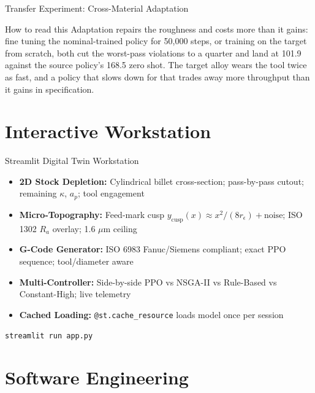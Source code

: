 ﻿\documentclass[11pt,aspectratio=169]{beamer}
\newcommand{\Ra}{R_a}
\begin{document}
\begin{frame}{Transfer Experiment: Cross-Material Adaptation}
\begin{block}{How to read this}
    \alert{Adaptation repairs the roughness and costs more than it gains}: fine tuning the
    nominal-trained policy for 50,000 steps, or training on the target from scratch, both cut the
    worst-pass violations to a quarter and land at 101.9 against the source policy's 168.5 zero shot.
    The target alloy wears the tool twice as fast, and a policy that slows down for that trades away
    more throughput than it gains in specification.
    \end{block}
\end{frame}

\section{Interactive Workstation}

\begin{frame}{Streamlit Digital Twin Workstation}
    \begin{itemize}
        \item \textbf{2D Stock Depletion:} Cylindrical billet cross-section; pass-by-pass cutout; remaining $\kappa$, $a_p$; tool engagement
        \item \textbf{Micro-Topography:} Feed-mark cusp $y_{\text{cusp}}(x) \approx x^2/(8 r_\epsilon) + \text{noise}$; ISO 1302 $\Ra$ overlay; 1.6 $\mu$m ceiling
        \item \textbf{G-Code Generator:} ISO 6983 Fanuc/Siemens compliant; exact PPO sequence; tool/diameter aware
        \item \textbf{Multi-Controller:} Side-by-side PPO vs NSGA-II vs Rule-Based vs Constant-High; live telemetry
        \item \textbf{Cached Loading:} \texttt{@st.cache\_resource} loads model once per session
    \end{itemize}

    \vspace{1em}
    \centering
    \texttt{streamlit run app.py}
\end{frame}

\section{Software Engineering}
\end{document}
